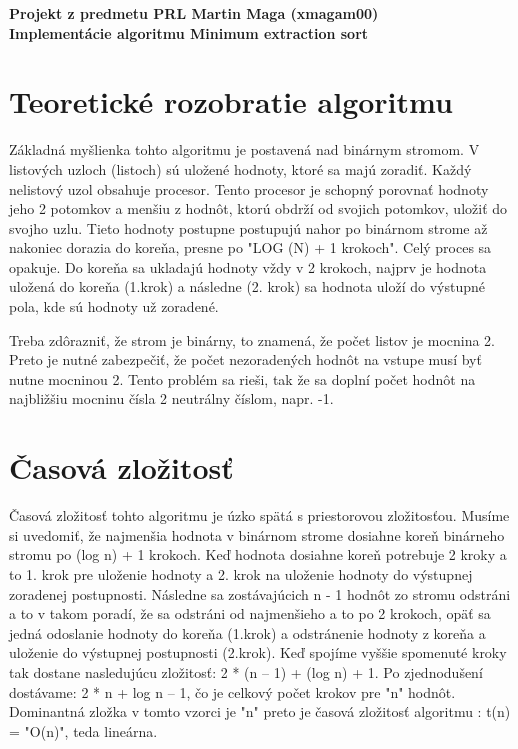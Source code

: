\documentclass[11pt,a4paper,titlepage,final]{article}
\begin{document}
\raggedright\large{\textbf{Projekt z predmetu PRL Martin Maga (xmagam00) \\Implementácie algoritmu Minimum extraction sort}}

\section{Teoretické rozobratie algoritmu}
Základná myšlienka tohto algoritmu je postavená nad binárnym stromom. V listových uzloch (listoch) sú uložené hodnoty, ktoré sa majú zoradiť. Každý nelistový uzol obsahuje procesor. Tento procesor je schopný porovnať hodnoty jeho 2 potomkov a menšiu z hodnôt, ktorú obdrží od svojich potomkov, uložiť do svojho uzlu. Tieto hodnoty postupne postupujú nahor po binárnom strome až nakoniec dorazia do koreňa, presne po "LOG (N) + 1 krokoch". Celý proces sa opakuje. Do koreňa sa ukladajú hodnoty vždy v 2 krokoch, najprv je hodnota uložená do koreňa (1.krok) a následne (2. krok) sa hodnota uloží do výstupné pola, kde sú hodnoty už zoradené.

Treba zdôrazniť, že strom je binárny, to znamená, že počet listov je mocnina 2. Preto je nutné zabezpečiť, že počet nezoradených hodnôt na vstupe musí byť nutne mocninou 2. Tento problém sa rieši, tak že sa doplní počet hodnôt na najbližšiu mocninu čísla 2 neutrálny číslom, napr. -1.
\section{Časová zložitosť}
Časová zložitosť tohto algoritmu je úzko spätá s priestorovou zložitosťou. Musíme si uvedomiť, že najmenšia hodnota v binárnom strome dosiahne koreň binárneho stromu po (log n) + 1 krokoch. Keď hodnota dosiahne koreň potrebuje 2 kroky a to 1. krok pre uloženie hodnoty a 2. krok na uloženie hodnoty do výstupnej zoradenej postupnosti. Následne sa zostávajúcich n - 1 hodnôt zo stromu odstráni a to v takom poradí, že sa odstráni od najmenšieho a to po 2 krokoch, opäť sa jedná odoslanie hodnoty do koreňa (1.krok) a odstránenie hodnoty z koreňa a uloženie do výstupnej postupnosti (2.krok). Keď spojíme vyššie spomenuté kroky tak dostane nasledujúcu zložitosť: 2 * (n – 1) + (log n) + 1. Po zjednodušení dostávame: 2 * n + log n – 1, čo je celkový počet krokov pre "n" hodnôt. Dominantná zložka v tomto vzorci je "n" preto je časová zložitosť algoritmu : t(n) = "O(n)", teda lineárna.
\end{document}
